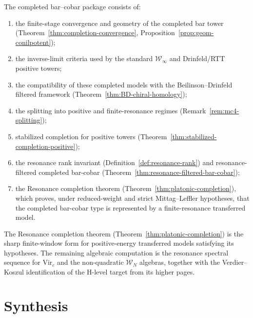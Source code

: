 \begin{remark}\label{rem:nilpotent-main}
The completed bar--cobar package consists of:
\begin{enumerate}
\item the finite-stage convergence and geometry of the completed bar
 tower
 \textup{(}Theorem~\ref{thm:completion-convergence},
 Proposition~\ref{prop:geom-conilpotent}\textup{)};
\item the inverse-limit criteria used by the standard
 $\mathcal{W}_\infty$ and Drinfeld/RTT positive towers;
\item the compatibility of these completed models with the
 Beilinson--Drinfeld filtered framework
 \textup{(}Theorem~\ref{thm:BD-chiral-homology}\textup{)};
\item the splitting into positive and finite-resonance regimes
 \textup{(}Remark~\ref{rem:mc4-splitting}\textup{)};
\item stabilized completion for positive towers
 \textup{(}Theorem~\ref{thm:stabilized-completion-positive}\textup{)};
\item the resonance rank invariant
 \textup{(}Definition~\ref{def:resonance-rank}\textup{)}
 and resonance-filtered completed bar-cobar
 \textup{(}Theorem~\ref{thm:resonance-filtered-bar-cobar}\textup{)};
\item the Resonance completion theorem
 \textup{(}Theorem~\ref{thm:platonic-completion}\textup{)},
 which proves, under reduced-weight and strict Mittag--Leffler
 hypotheses, that the completed bar-cobar type is represented by a
 finite-resonance transferred model.
\end{enumerate}
The Resonance completion theorem
\textup{(}Theorem~\ref{thm:platonic-completion}\textup{)}
is the sharp finite-window form for positive-energy transferred models
satisfying its hypotheses.  The remaining algebraic computation is the
resonance spectral sequence for $\mathrm{Vir}_c$ and the
non-quadratic $\mathcal W_N$ algebras, together with the
Verdier--Koszul identification of the H-level target from its higher
pages.
\end{remark}

\section{Synthesis}
\label{sec:nc-supplement}

